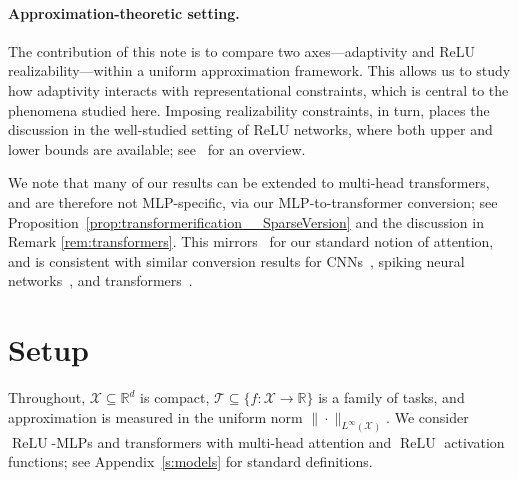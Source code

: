 \documentclass{article}
\begin{document}
\paragraph{Approximation-theoretic setting.}
The contribution of this note is to compare two axes---adaptivity and ReLU realizability---within a uniform approximation framework. This allows us to study how adaptivity interacts with representational constraints, which is central to the phenomena studied here. Imposing realizability constraints, in turn, places the discussion in the well-studied setting of ReLU networks, where both upper and lower bounds are available; see~\cite{petersen2024mathematical} for an overview.

We note that many of our results can be extended to multi-head transformers, and are therefore not MLP-specific, via our MLP-to-transformer conversion; see Proposition~\ref{prop:transformerification__SparseVersion} and the discussion in Remark \ref{rem:transformers}. 
This mirrors~\cite[Proposition 11]{kratsios2025context} for our standard notion of attention, and is consistent with similar conversion results for CNNs~\cite{petersen2020equivalence}, spiking neural networks~\cite{dold2026equivalence, neuman2025stable}, and transformers~\cite{hu2026transformerapproximationsrelus}. 


\section{Setup}\label{sec:setup}


Throughout, $\mathcal X\subseteq \mathbb R^d$ is compact, $\mathcal{T}\subseteq\{f:\mathcal X\to
\mathbb R\}$ is a family of tasks, and approximation is measured in the uniform norm
$\|\cdot\|_{L^\infty(\mathcal X)}$.  We consider $\operatorname{ReLU}$-MLPs and transformers with multi-head attention and $\operatorname{ReLU}$ activation functions; see Appendix~\ref{s:models} for standard definitions. 
\end{document}
